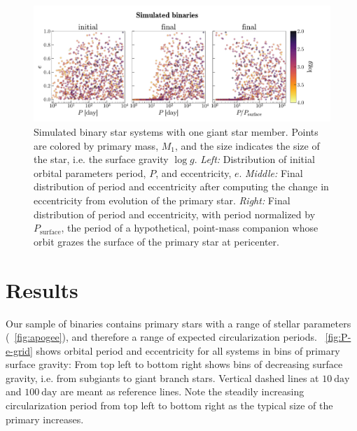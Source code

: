 \documentclass[modern, letterpaper]{aastex62}
\newcommand{\Psurf}{\ensuremath{P_\textrm{surface}}}
\begin{document}
\begin{figure}[htbp]
\begin{center}
\includegraphics[trim={0 0 1cm 0}, clip, width=\linewidth]{simulated}
\end{center}
\caption{%
Simulated binary star systems with one giant star member.
Points are colored by primary mass, $M_1$, and the size indicates the size of
the star, i.e. the surface gravity $\log g$.
\textit{Left:} Distribution of initial orbital parameters period, $P$, and
eccentricity, $e$.
\textit{Middle:} Final distribution of period and eccentricity after computing
the change in eccentricity from evolution of the primary star.
\textit{Right:} Final distribution of period and eccentricity, with period
normalized by \Psurf, the period of a hypothetical, point-mass
companion whose orbit grazes the surface of the primary star at pericenter.
\label{fig:simulated}
}
\end{figure}


\section{Results}
\label{sec:results}

Our sample of binaries contains primary stars with a range of stellar parameters
(\figurename~\ref{fig:apogee}), and therefore a range of expected
circularization periods.
\figurename~\ref{fig:P-e-grid} shows orbital period and eccentricity for all
systems in bins of primary surface gravity:
From top left to bottom right shows bins of decreasing surface gravity, i.e.
from subgiants to giant branch stars.
Vertical dashed lines at $10~\textrm{day}$ and $100~\textrm{day}$ are meant as
reference lines.
Note the steadily increasing circularization period from top left to bottom
right as the typical size of the primary increases.
\end{document}
